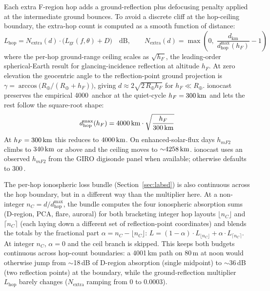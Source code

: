 \documentclass[11pt,a4paper]{article}
\newcommand{\SI}[2]{#1\,\text{#2}}
\newcommand{\km}{\text{km}}
\begin{document}
Each extra F-region hop adds a ground-reflection plus defocusing
penalty applied at the intermediate ground bounces. To avoid a
discrete cliff at the hop-ceiling boundary, the extra-hop count
is computed as a smooth function of distance:
\begin{equation}\label{eq:lhop}
  L_{\text{hop}} = N_{\text{extra}}(d) \cdot
    \bigl(L_{\text{gr}}(f, \theta) + D\bigr) \quad\text{dB},\qquad
  N_{\text{extra}}(d) = \max\!\left(0,\; \frac{d_{\text{km}}}{d_{\text{hop}}^{\max}(h_F)} - 1\right)
\end{equation}
where the per-hop ground-range ceiling scales as $\sqrt{h_F}$, the
leading-order spherical-Earth result for glancing-incidence
reflection at altitude $h_F$. At zero elevation the geocentric angle
to the reflection-point ground projection is
$\gamma = \arccos\!\bigl(R_\oplus / (R_\oplus + h_F)\bigr)$, giving
$d \approx 2\sqrt{2\,R_\oplus h_F}$ for $h_F \ll R_\oplus$.
ionocast preserves the empirical \SI{4000}{\km} anchor at the
quiet-cycle $h_F = \SI{300}{\km}$ and lets the rest follow the
square-root shape:
\begin{equation}\label{eq:hopceiling}
  d_{\text{hop}}^{\max}(h_F) = \SI{4000}{\km} \cdot
    \sqrt{\frac{h_F}{\SI{300}{\km}}}
\end{equation}
At $h_F = \SI{300}{\km}$ this reduces to $\SI{4000}{\km}$. On
enhanced-solar-flux days $h_{m\!F2}$ climbs to $\SI{340}{\km}$ or
above and the ceiling moves to ${\sim}\SI{4258}{\km}$.  ionocast
uses an observed $h_{m\!F2}$ from the GIRO digisonde panel when
available; otherwise defaults to \SI{300}{\km}.

The per-hop ionospheric loss bundle (Section~\ref{sec:labsd}) is
also continuous across the hop boundary, but in a different way
than the multiplier here.  At a non-integer $n_C = d /
d_{\text{hop}}^{\max}$, the bundle computes the four ionospheric
absorption sums (D-region, PCA, flare, auroral) for both
bracketing integer hop layouts $\lfloor n_C \rfloor$ and
$\lceil n_C \rceil$ (each laying down a different set of
reflection-point coordinates) and blends the totals by the
fractional part $\alpha = n_C - \lfloor n_C \rfloor$:
$L = (1 - \alpha) \cdot L_{\lfloor n_C \rfloor} +
     \alpha \cdot L_{\lceil n_C \rceil}$.
At integer $n_C$, $\alpha = 0$ and the ceil branch is skipped.
This keeps both budgets continuous across hop-count boundaries: a
4001\,km path on 80\,m at noon would otherwise jump from
$\sim$18\,dB of D-region absorption (single midpoint) to
$\sim$36\,dB (two reflection points) at the boundary, while the
ground-reflection multiplier $L_{\text{hop}}$ barely changes
($N_{\text{extra}}$ ramping from 0 to 0.0003).
\end{document}
